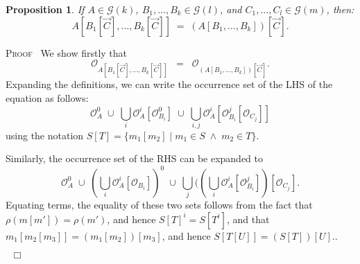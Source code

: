 \documentclass[a4paper,11pt]{article}
\newtheorem{proposition}{Proposition}[section]
\newcommand{\GG}[1]{\mathcal{G}(#1)}
\newcommand{\Occ}{\mathcal{O}}
\newenvironment{proof}{\textsc{Proof}\ }{$\;\; \Box$}
\begin{document}
\begin{proposition}
\label{sub00}
If $A \in \GG{k}$, $B_1 , \ldots , B_k \in \GG{l}$, and $C_1 , \ldots
, C_l \in \GG{m}$, then:
\[ A[B_1 [\vec{C}], \ldots , B_k [\vec{C}]] \; = \; (A[B_1 ,
\ldots , B_k ])[\vec{C}] . \]
\end{proposition}
\begin{proof}
We show firstly that
\[ \Occ_{A[B_1 [\vec{C}], \ldots , B_k [\vec{C}]]} \;\; = \;\; \Occ_{(A[B_1 ,
\ldots , B_k ])[\vec{C}]} . \]
Expanding the definitions, we can write the occurrence set of the LHS
of the equation as follows:
\[ \Occ_A^0 \; \cup \; \bigcup_i \Occ_A^i [\Occ_{B_i}^0] \; \cup \;
\bigcup_{i,j} \Occ_A^i [\Occ_{B_i}^j [\Occ_{C_j}]]  \] using the
notation $S[T] = \{ m_1[m_2] \mid m_1 \in S \; \wedge \; m_2 \in T
\}$.

Similarly, the occurrence set of the RHS can be expanded to
\[ \Occ_A^0 \; \cup \; (\bigcup_{i} \Occ_A^i [\Occ_{B_i}])^0 \; \cup
\; \bigcup_{j}((\bigcup_i \Occ_A^i [\Occ_{B_i}^j])[\Occ_{C_j}] .
\] Equating terms, the equality of these two sets follows from the
fact that $\rho (m[m']) = \rho(m')$, and hence $S[T]^i = S[T^i]$,
and that $m_1[m_2[m_3]] = (m_1[m_2])[m_3]$, and hence $S[T[U]] =
(S[T])[U]$..


\end{proof}
\end{document}
